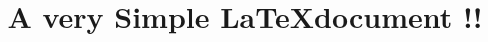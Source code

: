 \documentclass{article}
\begin{document}
\title{A very Simple \LaTeX document !! }
\date{}
\maketitle
\end{document}
